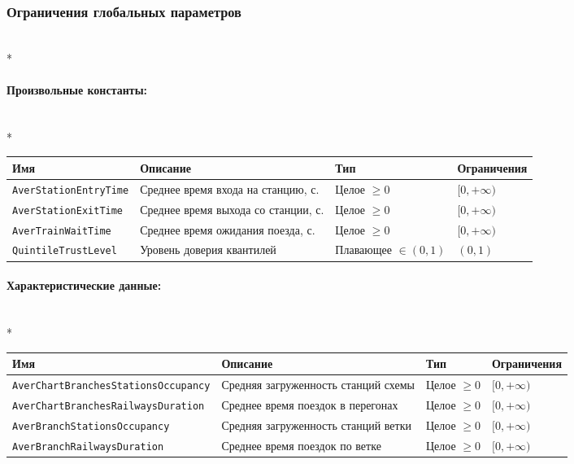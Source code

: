 \documentclass[12pt]{article}
\begin{document}
\subsubsection*{Ограничения глобальных параметров}\mbox{}\\*

\paragraph{Произвольные константы:}\mbox{}\\*

\begin{tabular}{|l|>{\raggedright\arraybackslash}m{5cm}|l|l|}
\hline
Имя & Описание & Тип & Ограничения \\
\hline
\texttt{AverStationEntryTime} & Среднее время входа на станцию, с. & Целое $\geq 0$ & $[0, +\infty)$ \\
\hline
\texttt{AverStationExitTime} & Среднее время выхода со станции, с. & Целое $\geq 0$ & $[0, +\infty)$ \\
\hline
\texttt{AverTrainWaitTime} & Среднее время ожидания поезда, с. & Целое $\geq 0$ & $[0, +\infty)$ \\
\hline
\texttt{QuintileTrustLevel} & Уровень доверия квантилей & Плавающее $\in (0, 1)$ & $(0, 1)$ \\
\hline
\end{tabular}

\paragraph{Характеристические данные:}\mbox{}\\*

\begin{tabular}{|l|>{\raggedright\arraybackslash}m{3.6cm}|l|l|}
\hline
Имя & Описание & Тип & Ограничения \\
\hline
\texttt{AverChartBranchesStationsOccupancy} & Средняя загруженность станций схемы & Целое $\geq 0$ & $[0, +\infty)$ \\
\hline
\texttt{AverChartBranchesRailwaysDuration} & Среднее время поездок в перегонах & Целое $\geq 0$ & $[0, +\infty)$ \\
\hline
\texttt{AverBranchStationsOccupancy} & Средняя загруженность станций ветки & Целое $\geq 0$ & $[0, +\infty)$ \\
\hline
\texttt{AverBranchRailwaysDuration} & Среднее время поездок по ветке & Целое $\geq 0$ & $[0, +\infty)$ \\
\hline
\end{tabular}
\end{document}
